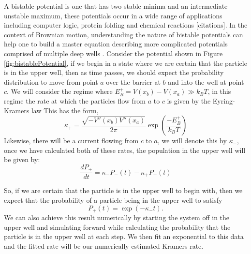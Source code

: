 A bistable potential is one that has two stable minima and an intermediate unstable maximum, these potentials occur in a wide range of applications including computer logic, protein folding and chemical reactions [citations]. In the context of Brownian motion, understanding the nature of bistable potentials can help one to build a master equation describing more complicated potentials comprised of multiple deep wells \cite{Barcilon1996, ChallisJack2014}. Consider the potential shown in Figure \ref{fig:bistablePotential}, if we begin in a state where we are certain that the particle is in the upper well, then as time passes, we should expect the probability distribution to move from point $a$ over the barrier at $b$ and into the well at point $c$. We will consider the regime where $E^+_B = V(x_b) - V(x_a) \gg k_B T$, in this regime the rate at which the particles flow from $a$ to $c$ is given by the Eyring-Kramers law \cite{Eyring1935, Kramers1940}
This has the form,
\begin{equation}
\kappa_+ = \frac{\sqrt{-V''(x_b) V''(x_a)}}{2 \pi} \exp \left({\frac{-E^+_B}{k_B T}} \right)
\end{equation}
Likewise, there will be a current flowing from $c$ to $a$, we will denote this by $\kappa_-$, once we have calculated both of these rates, the population in the upper well will be given by:
\begin{equation}
\frac{d P_+}{d t} = \kappa_- P_-(t) - \kappa_+ P_+(t)
\end{equation}

So, if we are certain that the particle is in the upper well to begin with, then we expect that the probability of a particle being in the upper well to satisfy
\begin{equation}
P_+(t) = \exp{(-\kappa_- t)}.
\end{equation}
We can also achieve this result numerically by starting the system off in the upper well and simulating forward while calculating the probability that the particle is in the upper well at each step. We then fit an exponential to this data and the fitted rate will be our numerically estimated Kramers rate.

